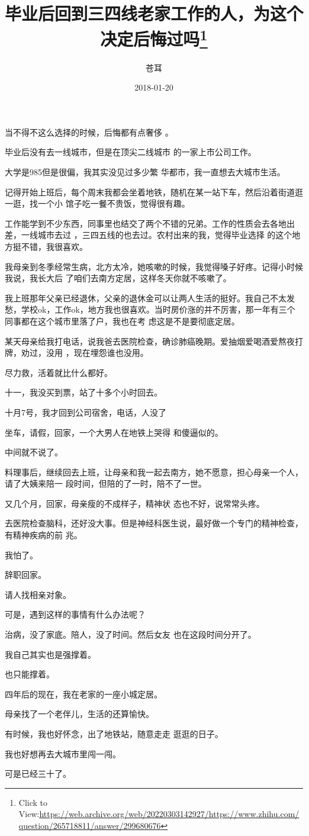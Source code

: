 \documentclass{article}
\title{毕业后回到三四线老家工作的人，为这个决定后悔过吗\footnote{Click to View:\url{https://web.archive.org/web/20220303142927/https://www.zhihu.com/question/265718811/answer/299680676}}}
\author{苍耳}
\date{2018-01-20}
\begin{document}

\maketitle


\Large

﻿当不得不这么选择的时候，后悔都有点奢侈
。 

毕业后没有去一线城市，但是在顶尖二线城市
的一家上市公司工作。 

大学是985但是很偏，我其实没见过多少繁
华都市，我一直想去大城市生活。 

记得开始上班后，每个周末我都会坐着地铁，随机在某一站下车，然后沿着街道逛一逛，找一个小
馆子吃一餐不贵饭，觉得很有趣。 

工作能学到不少东西，同事里也结交了两个不错的兄弟。工作的性质会去各地出差，一线城市去过
\newpage
，三四五线的也去过。农村出来的我，觉得毕业选择
的这个地方挺不错，我很喜欢。 

我母亲到冬季经常生病，北方太冷，她咳嗽的时候，我觉得嗓子好疼。记得小时候我说，我长大后
了咱们去南方定居，这样冬天你就不咳嗽了。 

我上班那年父亲已经退休，父亲的退休金可以让两人生活的挺好。我自己不太发愁，学校ok，工作ok，地方我也很喜欢。当时房价涨的并不厉害，那一年有三个同事都在这个城市里落了户，我也在考
虑这是不是要彻底定居。 

某天母亲给我打电话，说我爸去医院检查，确诊肺癌晚期。爱抽烟爱喝酒爱熬夜打牌，劝过，没用
，现在埋怨谁也没用。 


尽力救，活着就比什么都好。 


十一，我没买到票，站了十多个小时回去。 

\newpage

十月7号，我才回到公司宿舍，电话，人没了

坐车，请假，回家，一个大男人在地铁上哭得
和傻逼似的。 


中间就不说了。 

料理事后，继续回去上班，让母亲和我一起去南方，她不愿意，担心母亲一个人，请了大姨来陪一
段时间，但陪的了一时，陪不了一世。 

又几个月，回家，母亲瘦的不成样子，精神状
态也不好，说常常头疼。 

去医院检查脑科，还好没大事。但是神经科医生说，最好做一个专门的精神检查，有精神疾病的前
兆。 


我怕了。 


\newpage

辞职回家。 


请人找相亲对象。 


可是，遇到这样的事情有什么办法呢？ 

治病，没了家底。陪人，没了时间。然后女友
也在这段时间分开了。 


我自己其实也是强撑着。 


也只能撑着。 


四年后的现在，我在老家的一座小城定居。 


母亲找了一个老伴儿，生活的还算愉快。 

有时候，我也好怀念，出了地铁站，随意走走
逛逛的日子。 


我也好想再去大城市里闯一闯。 

\newpage
可是已经三十了。
\end{document}
